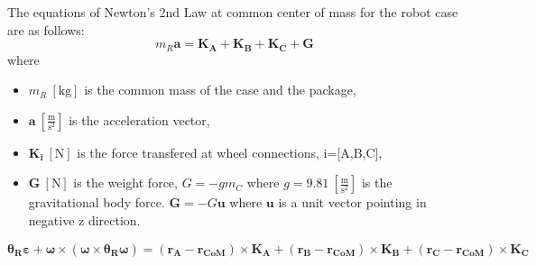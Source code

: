 \documentclass[12pt,english,twoside]{article}
\begin{document}
The equations of Newton's 2nd Law at common center of mass for the robot case are as follows:
\begin{equation}
	m_R \mathbf{a} = \mathbf{K_A} + \mathbf{K_B} + \mathbf{K_C} + \mathbf{G}
\end{equation}
where \begin{itemize}
	\item $m_R~[\text{kg}]$ is the common mass of the case and the package,
	\item $\mathbf{a}~[\frac{\text{m}}{\text{s}^2}]$ is the acceleration vector,
	\item $\mathbf{K_i}~[\text{N}]$ is the force transfered at wheel connections, i=[A,B,C],
	\item $\mathbf{G}~[\text{N}]$ is the weight force, $G=-g m_C$ where $g=9.81~[\frac{\text{m}}{\text{s}^2}]$ is the gravitational body force. $\mathbf{G}=-G \mathbf{u}$ where $\mathbf{u}$ is a unit vector pointing in negative z direction.
\end{itemize}
\begin{equation}
\boldsymbol{\theta_R} \boldsymbol{\varepsilon} +\boldsymbol{\omega} \times (\boldsymbol{\omega} \times \boldsymbol{\theta_R \boldsymbol{\omega}}) = (\mathbf{r_A}-\mathbf{r_{CoM}}) \times \mathbf{K_A} + (\mathbf{r_B}-\mathbf{r_{CoM}}) \times \mathbf{K_B} + (\mathbf{r_C}-\mathbf{r_{CoM}}) \times  \mathbf{K_C}
\end{equation}
\end{document}
